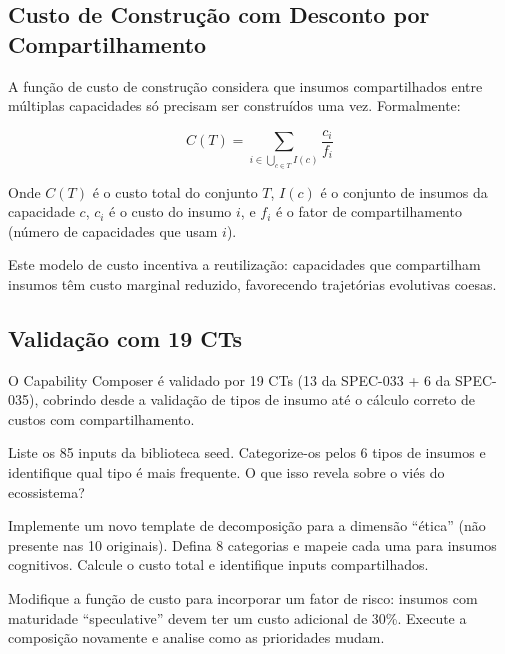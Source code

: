 \subsection{Custo de Construção com Desconto por Compartilhamento}

A função de custo de construção considera que insumos compartilhados entre
múltiplas capacidades só precisam ser construídos uma vez. Formalmente:

\begin{equation}
C(T) = \sum_{i \in \bigcup_{c \in T} I(c)} \frac{c_i}{f_i}
\end{equation}

Onde $C(T)$ é o custo total do conjunto $T$, $I(c)$ é o conjunto de
insumos da capacidade $c$, $c_i$ é o custo do insumo $i$, e $f_i$ é o
fator de compartilhamento (número de capacidades que usam $i$).

Este modelo de custo incentiva a reutilização: capacidades que compartilham
insumos têm custo marginal reduzido, favorecendo trajetórias evolutivas
coesas.

\subsection{Validação com 19 CTs}

O Capability Composer é validado por 19 CTs (13 da SPEC-033 + 6 da
SPEC-035), cobrindo desde a validação de tipos de insumo até o cálculo
correto de custos com compartilhamento.

\begin{exercicio}
Liste os 85 inputs da biblioteca seed. Categorize-os pelos 6 tipos de
insumos e identifique qual tipo é mais frequente. O que isso revela sobre
o viés do ecossistema?
\end{exercicio}

\begin{exercicio}
Implemente um novo template de decomposição para a dimensão ``ética'' (não
presente nas 10 originais). Defina 8 categorias e mapeie cada uma para
insumos cognitivos. Calcule o custo total e identifique inputs
compartilhados.
\end{exercicio}

\begin{exercicio}
Modifique a função de custo para incorporar um fator de risco: insumos com
maturidade ``speculative'' devem ter um custo adicional de 30\%. Execute
a composição novamente e analise como as prioridades mudam.
\end{exercicio}

